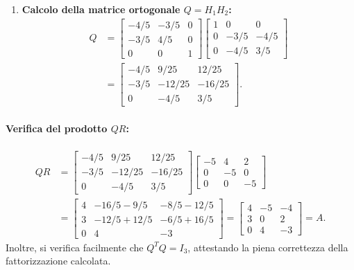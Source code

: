 \begin{example}
\begin{enumerate}
\begin{equation}
    \end{equation}
    \item \textbf{Calcolo della matrice ortogonale $Q = H_1 H_2$:}
    \begin{align}
        Q &= \begin{bmatrix} 
        -4/5 & -3/5 & 0 \\ 
        -3/5 & 4/5 & 0 \\ 
        0 & 0 & 1 
        \end{bmatrix}
        \begin{bmatrix} 
        1 & 0 & 0 \\ 
        0 & -3/5 & -4/5 \\ 
        0 & -4/5 & 3/5 
        \end{bmatrix} \nonumber\\
        &= \begin{bmatrix} 
        -4/5 & 9/25 & 12/25 \\ 
        -3/5 & -12/25 & -16/25 \\ 
        0 & -4/5 & 3/5 
        \end{bmatrix}.
    \end{align}
\end{enumerate}

\paragraph{Verifica del prodotto $Q R$:}
\begin{align}
    Q R &= \begin{bmatrix} 
    -4/5 & 9/25 & 12/25 \\ 
    -3/5 & -12/25 & -16/25 \\ 
    0 & -4/5 & 3/5 
    \end{bmatrix}
    \begin{bmatrix} 
    -5 & 4 & 2 \\ 
    0 & -5 & 0 \\ 
    0 & 0 & -5 
    \end{bmatrix} \nonumber\\[6pt]
    &= \begin{bmatrix}
    4 & -16/5 - 9/5 & -8/5 - 12/5 \\
    3 & -12/5 + 12/5 & -6/5 + 16/5 \\
    0 & 4 & -3
    \end{bmatrix}
    = \begin{bmatrix} 
    4 & -5 & -4 \\ 
    3 & 0 & 2 \\ 
    0 & 4 & -3 
    \end{bmatrix} = A.
\end{align}
Inoltre, si verifica facilmente che $Q^T Q = I_3$, attestando la piena correttezza della fattorizzazione calcolata.
\end{example}

